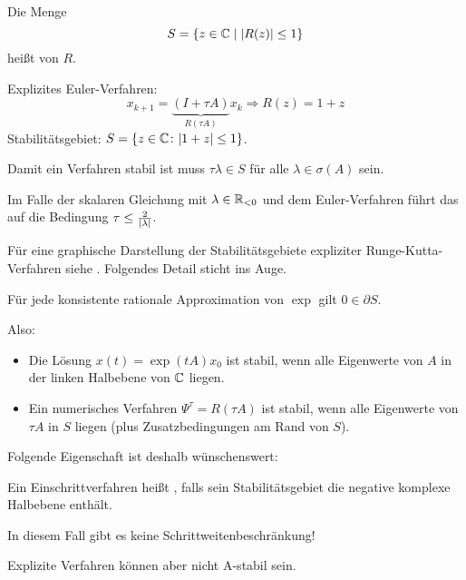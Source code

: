 \begin{defi}
	Die Menge
	\begin{equation*}
		S=\left\lbrace z \in \mathbb C \mid \left\vert R(z) \right\vert \leq 1 \right\rbrace
	\end{equation*}
	heißt  von $R$.
\end{defi}
\begin{bsp}
	Explizites Euler-Verfahren: 
	\begin{equation*}
		x_{k+1}=\underbrace{\left(I+\tau A \right)}_{R \left(\tau A \right)}x_k \Rightarrow R(z)=1+z
	\end{equation*}
	Stabilitätsgebiet: $S=\left\lbrace z \in \mathbb C \colon \lvert 1+z \rvert \leq 1 \right\rbrace$.
\end{bsp}

Damit ein Verfahren stabil ist muss $\tau \lambda \in S$ für alle $\lambda \in \sigma (A)$ sein.


Im Falle der skalaren Gleichung mit $\lambda \in \mathbb R_{< 0}$ und dem Euler-Verfahren führt das auf die Bedingung $\tau \leq \frac{2}{\lvert \lambda \rvert}$.

Für eine graphische Darstellung der Stabilitätsgebiete expliziter Runge-Kutta-Verfahren siehe \cite[Seite~238]{deuflhard_bornemann:2008}. Folgendes Detail sticht ins Auge.

\begin{lemma}
	Für jede konsistente rationale Approximation von $\exp$ gilt $0 \in \partial S$.
\end{lemma}
Also: 
\begin{itemize}
	\item Die Lösung $x(t)=\exp (tA)x_0$ ist stabil, wenn alle Eigenwerte von $A$ in der linken Halbebene von $\mathbb C$ liegen.
	\item Ein numerisches Verfahren $\Psi^{\tau}=R \left(\tau A \right)$ ist stabil, wenn alle Eigenwerte von $\tau A$ in $S$ liegen (plus Zusatzbedingungen am Rand von $S$).
\end{itemize}

Folgende Eigenschaft ist deshalb wünschenswert:

\begin{defi}
	Ein Einschrittverfahren heißt , falls sein Stabilitätsgebiet die negative komplexe Halbebene enthält.
\end{defi}

In diesem Fall gibt es keine Schrittweitenbeschränkung!

Explizite Verfahren können aber nicht A-stabil sein.

